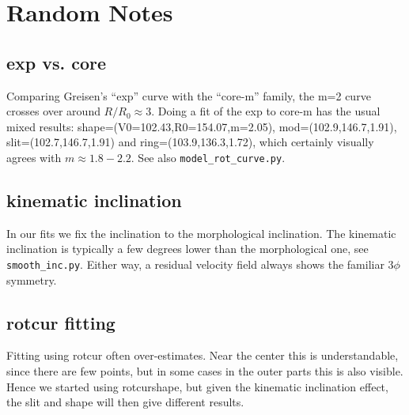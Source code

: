 \documentclass[12pt]{article}
\begin{document}
\section{Random Notes}

\subsection{exp vs. core}

Comparing Greisen's ``exp'' curve with the ``core-m'' family, the m=2 curve crosses over around $R/R_0 \approx 3$. Doing a fit
of the exp to core-m has the usual mixed results:   shape=(V0=102.43,R0=154.07,m=2.05),
mod=(102.9,146.7,1.91), slit=(102.7,146.7,1.91) and ring=(103.9,136.3,1.72), which certainly visually agrees with $m \approx 1.8-2.2$.
See also {\tt model\_rot\_curve.py}.

\subsection{kinematic inclination}

In our fits we fix the inclination to the morphological inclination. The kinematic inclination is typically a few degrees lower
than the morphological one, see {\tt smooth\_inc.py}. Either way, a residual velocity field always shows the familiar $3\phi$ symmetry.

\subsection{rotcur fitting}

Fitting using rotcur often over-estimates. Near the center this is understandable, since there are few points, but in some cases
in the outer parts this is also visible. Hence we started using rotcurshape, but given the kinematic inclination effect, the slit
and shape will then give different results.
\end{document}
